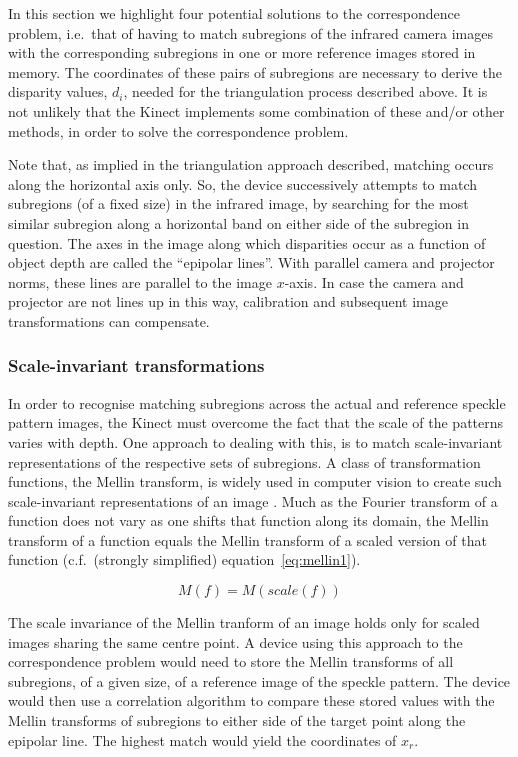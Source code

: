In this section we highlight four potential solutions to the correspondence
problem, i.e.\ that of having to match subregions of the infrared camera images
with the corresponding subregions in one or more reference images stored in
memory. The coordinates of these pairs of subregions are necessary to derive
the disparity values, $d_i$, needed for the triangulation process described
above.  It is not unlikely that the Kinect implements some combination of these
and/or other methods, in order to solve the correspondence problem.

Note that, as implied in the triangulation approach described, matching occurs
along the horizontal axis only. So, the device successively attempts to match
subregions (of a fixed size) in the infrared image, by searching for the most
similar subregion along a horizontal band on either side of the subregion in
question. The axes in the image along which disparities occur as a function of
object depth are called the ``epipolar lines''. With parallel camera and
projector norms, these lines are parallel to the image $x$-axis. In case the
camera and projector are not lines up in this way, calibration and subsequent
image transformations can compensate.


\subsubsection{Scale-invariant transformations}

In order to recognise matching subregions across the actual and reference
speckle pattern images, the Kinect must overcome the fact that the scale of the
patterns varies with depth. One approach to dealing with this, is to match
scale-invariant representations of the respective sets of subregions. A class of
transformation functions, the Mellin transform, is widely used in computer
vision to create such scale-invariant representations of an image \cite{casasent1977new}. Much as the
Fourier transform of a function does not vary as one shifts that function along
its domain, the Mellin transform of a function equals the Mellin transform of a
scaled version of that function (c.f.\ (strongly simplified)
equation~\ref{eq:mellin1}).

\begin{equation} \label{eq:mellin1}
    M (f) = M(scale(f))
\end{equation}

The scale invariance of the Mellin tranform of an image holds only for scaled
images sharing the same centre point. A device using this approach to the
correspondence problem would need to store the Mellin transforms of all
subregions, of a given size, of a reference image of the speckle pattern. The
device would then use a correlation algorithm to compare these stored values
with the Mellin transforms of subregions to either side of the target point
along the epipolar line. The highest match would yield the coordinates of $x_r$.


